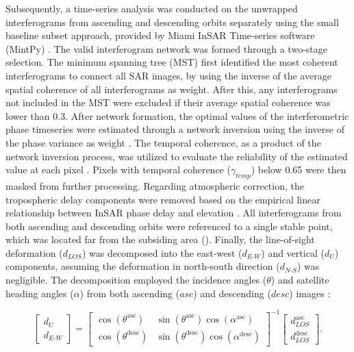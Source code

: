 Subsequently, a time-series analysis was conducted on the unwrapped interferograms from ascending and descending orbits separately using the small baseline subset approach, provided by Miami InSAR Time-series software (MintPy) \citep{yunjun_small_2019}. The valid interferogram network was formed through a two-stage selection. The minimum spanning tree (MST) \citep{perissin_repeat-pass_2012} first identified the most coherent interferograms to connect all SAR images, by using the inverse of the average spatial coherence of all interferograms as weight. After this, any interferograms not included in the MST were excluded if their average spatial coherence was lower than $\text{0.3}$. After network formation, the optimal values of the interferometric phase timeseries were estimated through a network inversion using the inverse of the phase variance as weight \citep{tough_statistical_1995}. The temporal coherence, as a product of the network inversion process, was utilized to evaluate the reliability of the estimated value at each pixel \citep{pepe_extension_2006}. Pixels with temporal coherence ($\gamma_\textit{temp}$) below 0.65 were then masked from further processing. Regarding atmospheric correction, the tropospheric delay components were removed based on the empirical linear relationship between InSAR phase delay and elevation \citep{doin_corrections_2009}. All interferograms from both ascending and descending orbits were referenced to a single stable point, which was located far from the subsiding area (). Finally, the line-of-sight deformation (${d_\textit{LOS}}$) was decomposed into the east-west (${d_\textit{E-W}}$) and vertical (${d_\textit{U}}$) components, assuming the deformation in north-south direction (${d_\textit{N-S}}$) was negligible. The decomposition employed the incidence angles ($\theta$) and satellite heading angles ($\alpha$) from both ascending ($\textit{asc}$) and descending ($\textit{desc}$) images \citep{hanssen_radar_2001}:

\begin{equation}
	\begin{bmatrix}
		d_{\textit{U}} \\
		d_{\textit{E-W}}
	\end{bmatrix}
	=
	\begin{bmatrix}
		\cos(\theta^{\text{asc}}) & \sin(\theta^{\text{asc}}) \cos(\alpha^{\text{asc}}) \\
		\cos(\theta^{\text{desc}}) & \sin(\theta^{\text{desc}}) \cos(\alpha^{\text{desc}})
	\end{bmatrix}^{-1}
	\begin{bmatrix}
		d_{\textit{LOS}}^{\text{asc}} \\
		d_{\textit{LOS}}^{\text{desc}}
	\end{bmatrix}.
	\label{eq:decomposition}
\end{equation}

